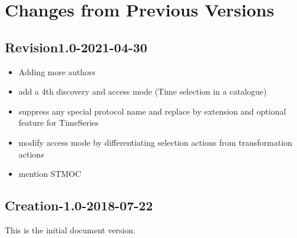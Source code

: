 \documentclass[11pt,a4paper]{ivoa}
\begin{document}
\appendix

\section{Changes from Previous Versions}
\subsection{Revision1.0-2021-04-30}
\begin{itemize}
\item Adding more authors
\item add a 4th discovery and access mode (Time selection in a catalogue)
\item suppress any special protocol name and replace by extension and optional feature for TimeSeries
\item modify access mode by differentiating selection actions from transformation actions
\item mention STMOC 
\end{itemize}
\subsection{Creation-1.0-2018-07-22}

This is the initial document version. 


\end{document}
